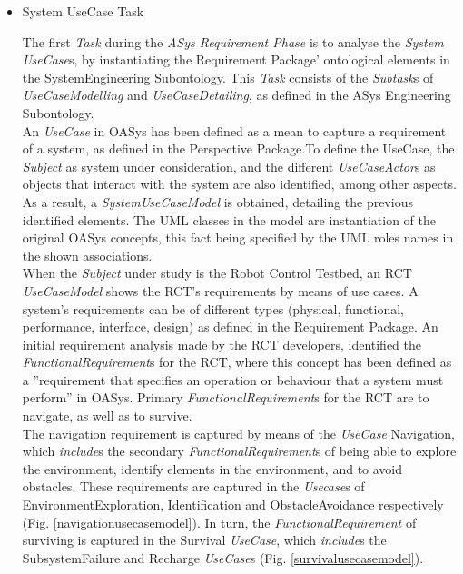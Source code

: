 \begin{itemize}
\item System UseCase Task

The first \emph{Task} during the \emph{ASys Requirement Phase} is to analyse the \emph{System UseCase}s, by instantiating the Requirement Package' ontological elements in the SystemEngineering Subontology. This \emph{Task} consists of the \emph{Subtask}s of \emph{UseCaseModelling} and \emph{UseCaseDetailing}, as defined in the ASys Engineering Subontology.\\

An \emph{UseCase} in OASys has been defined as a mean to capture a requirement of a system, as defined in the Perspective Package.To define the UseCase, the \emph{Subject} as system under consideration, and the different \emph{UseCaseActor}s as objects that interact with the system are also identified, among other aspects. As a result, a \emph{SystemUseCaseModel} is obtained, detailing the previous identified elements. The UML classes in the model are instantiation of the original OASys concepts, this fact being specified by the UML roles names in the shown associations. \\




When the \emph{Subject} under study is the Robot Control Testbed, an RCT \emph{UseCaseModel} shows the RCT's requirements by means of use cases. A system's requirements can be of different types (physical, functional, performance, interface, design) as defined in the Requirement Package.  An initial requirement analysis made by the RCT developers, identified the \emph{FunctionalRequirement}s for the RCT, where this concept has been defined as a ''requirement that specifies an operation or behaviour that a system must perform'' in OASys. Primary \emph{FunctionalRequirement}s for the RCT are to navigate, as well as to survive.\\

The navigation requirement is captured by means of the \emph{UseCase} Navigation, which \emph{include}s the secondary \emph{FunctionalRequirement}s of being able to explore the environment, identify elements in the environment, and to avoid obstacles. These requirements are captured in the \emph{Usecase}s of EnvironmentExploration, Identification and ObstacleAvoidance respectively (Fig. \ref{navigationusecasemodel}). In turn, the \emph{FunctionalRequirement} of surviving is captured in the Survival \emph{UseCase}, which \emph{include}s the SubsystemFailure and Recharge \emph{UseCase}s (Fig. \ref{survivalusecasemodel}).  \\


\end{itemize}
